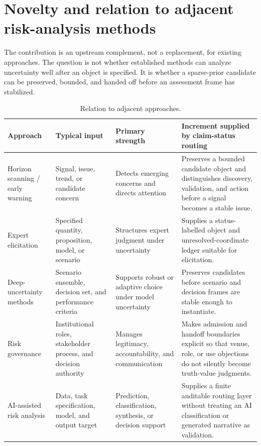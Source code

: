 \documentclass[10pt]{article}
\begin{document}
\section{Novelty and relation to adjacent risk-analysis methods}
\label{sec:novelty}

The contribution is an upstream complement, not a replacement, for existing approaches. The question is not whether established methods can analyze uncertainty well after an object is specified. It is whether a sparse-prior candidate can be preserved, bounded, and handed off before an assessment frame has stabilized.

\begin{table}[htbp]
\centering
\caption{Relation to adjacent approaches.}
\label{tab:novelty}
\small
\begin{tabularx}{\textwidth}{>{\raggedright\arraybackslash}p{}p{}p{}X}
\toprule
Approach & Typical input & Primary strength & Increment supplied by claim-status routing \\
\midrule
Horizon scanning / early warning & Signal, issue, trend, or candidate concern & Detects emerging concerns and directs attention & Preserves a bounded candidate object and distinguishes discovery, validation, and action before a signal becomes a stable issue. \\
Expert elicitation & Specified quantity, proposition, model, or scenario & Structures expert judgment under uncertainty & Supplies a status-labelled object and unresolved-coordinate ledger suitable for elicitation. \\
Deep-uncertainty methods & Scenario ensemble, decision set, and performance criteria & Supports robust or adaptive choice under model uncertainty & Preserves candidates before scenario and decision frames are stable enough to instantiate. \\
Risk governance & Institutional roles, stakeholder process, and decision authority & Manages legitimacy, accountability, and communication & Makes admission and handoff boundaries explicit so that venue, role, or use objections do not silently become truth-value judgments. \\
AI-assisted risk analysis & Data, task specification, model, and output target & Prediction, classification, synthesis, or decision support & Supplies a finite auditable routing layer without treating an AI classification or generated narrative as validation. \\
\bottomrule
\end{tabularx}
\end{table}
\end{document}
